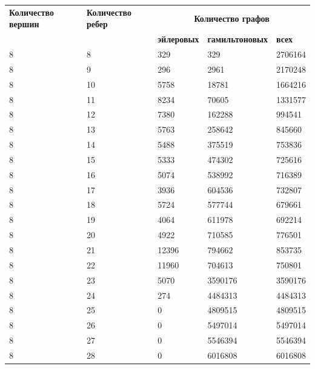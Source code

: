 \documentclass[12pt]{article}
\begin{document}
	\begin{tabular}{|m{3cm}|m{3cm}|m{2.5cm}|m{3.5cm}|m{2cm}|}
		\hline
		{\bf Количество вершин} & {\bf Количество ребер} & \multicolumn{3}{|c|}{\bf Количество графов}\\
		\cline{3-5}
		& & {\bf эйлеровых} &{\bf гамильтоновых} & {\bf всех} \\
		\hline
		8 & 8 & 329 & 329 & 2706164 \\
		\hline
		8 & 9 & 296 & 2961 & 2170248 \\
		\hline
		8 & 10 & 5758 & 18781 & 1664216 \\
		\hline
		8 & 11 & 8234 & 70605 & 1331577 \\
		\hline
		8 & 12 & 7380 & 162288 & 994541 \\
		\hline
		8 & 13 & 5763 & 258642 & 845660 \\
		\hline
		8 & 14 & 5488 & 375519 & 753836 \\
		\hline
		8 & 15 & 5333 & 474302 & 725616 \\
		\hline
		8 & 16 & 5074 & 538992 & 716389 \\
		\hline
		8 & 17 & 3936 & 604536 & 732807 \\
		\hline
		8 & 18 & 5724 & 577744 & 679661 \\
		\hline
		8 & 19 & 4064 & 611978 & 692214 \\
		\hline
		8 & 20 & 4922 & 710585 & 776501 \\
		\hline
		8 & 21 & 12396 & 794662 & 853735 \\
		\hline
		8 & 22 & 11960 & 704613 & 750801 \\
		\hline
		8 & 23 & 5070 & 3590176 & 3590176 \\
		\hline
		8 & 24 & 274 & 4484313 & 4484313 \\
		\hline
		8 & 25 & 0 & 4809515 & 4809515 \\
		\hline
		8 & 26 & 0 & 5497014 & 5497014 \\
		\hline
		8 & 27 & 0 & 5546394 & 5546394 \\
		\hline
		8 & 28 & 0 & 6016808 & 6016808 \\
		\hline
	\end{tabular}
	
\end{document}
